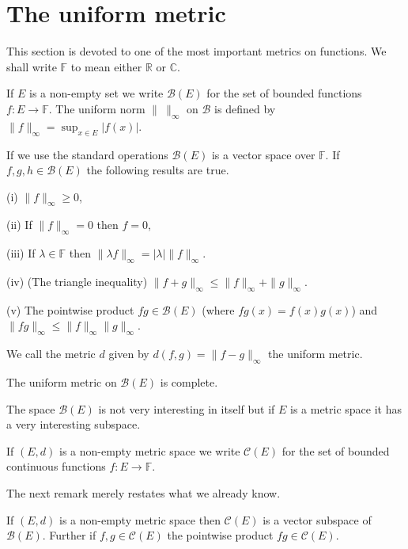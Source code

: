 \section{The uniform metric} This section is devoted
to one of the most important metrics on functions.
We shall write $\mathbb{F}$ to mean either
$\mathbb{R}$ or $\mathbb{C}$.
\begin{definition} If $E$ is a non-empty set
we write $\mathcal{B}(E)$ for the set of bounded
functions $f:E\rightarrow{\mathbb F}$.
The uniform norm $\|\ \|_{\infty}$ on $\mathcal{B}$
is defined by $\|f\|_{\infty}=\sup_{x\in E}|f(x)|$.
\end{definition}
\begin{lemma} If we use the standard operations
$\mathcal{B}(E)$  is a vector space
over $\mathbb{F}$. If $f,g,h\in\mathcal{B}(E)$ the following
results are true.

(i) $\|f\|_{\infty}\geq 0$,

(ii) If  $\|f\|_{\infty}= 0$ then $f=0$,

(iii) If $\lambda\in{\mathbb F}$
then $\|\lambda f\|_{\infty}=|\lambda|\|f\|_{\infty}$.

(iv) (The triangle inequality)
$\|f+g\|_{\infty}\leq\|f\|_{\infty}+\|g\|_{\infty}$.

(v) The pointwise product $fg\in \mathcal{B}(E)$
(where $fg(x)=f(x)g(x)$) and 
$\|fg\|_{\infty}\leq\|f\|_{\infty}\|g\|_{\infty}$.
\end{lemma}
We call the metric $d$ given by $d(f,g)=\|f-g\|_{\infty}$
the uniform metric.
\begin{theorem}\label{uniform complete}
The uniform metric on
$\mathcal{B}(E)$ is complete.
\end{theorem}

The space $\mathcal{B}(E)$ is not very interesting
in itself but if $E$ is a metric space it has 
a very interesting subspace.
\begin{definition} If $(E,d)$ is a 
non-empty metric space
we write $\mathcal{C}(E)$ for the set of bounded
continuous functions $f:E\rightarrow{\mathbb F}$.
\end{definition}
The next remark merely restates what we already know.
\begin{lemma}
If $(E,d)$ is a 
non-empty metric space
then $\mathcal{C}(E)$ is a vector subspace of 
$\mathcal{B}(E)$. Further if $f,g\in \mathcal{C}(E)$
the pointwise product $fg\in \mathcal{C}(E)$.
\end{lemma}

